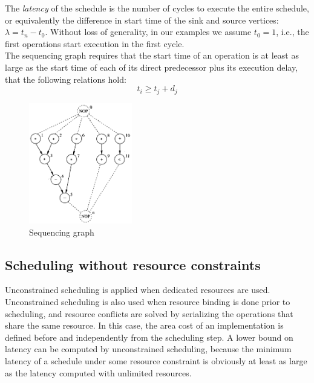 The  \textit{latency} of the schedule is the number of cycles to execute the entire schedule, or equivalently the difference in start time of the sink and source vertices:  $\lambda = t_{n} - t_{0}$.  Without loss of generality, in our examples we assume  $t_{0} = 1$,  i.e., the first operations start execution in  the first cycle.\\
The sequencing graph requires that the start time of an operation is at least as large as the start time of each of its direct predecessor plus its execution delay, that the following relations hold:
\[t_{i} \geq t_{j} + d_{j}\]
\begin{figure}[H]
    \centering
    \includegraphics[width=0.4\textwidth]{./Cap4/Images/Image01.png}
    \caption{Sequencing  graph}
    \label{fig:seqgraph}
\end{figure}

\subsection{Scheduling without resource constraints}
Unconstrained scheduling is applied when dedicated resources are used. Unconstrained scheduling is also used when resource binding is done prior to
scheduling, and resource conflicts are solved by serializing the operations that share the same resource. In this case, the area cost of an implementation is defined before and independently from the scheduling step. A lower bound on latency can be computed by unconstrained scheduling, because the minimum latency of  a  schedule under some resource constraint is obviously at least as large as the latency computed with unlimited resources.


